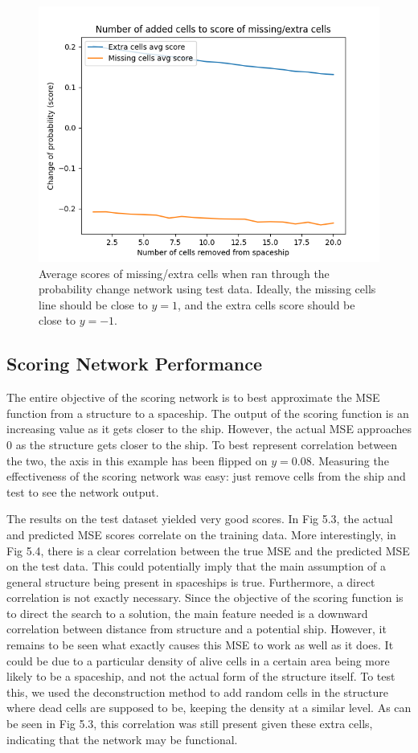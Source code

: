 \documentclass{l4proj}
\begin{document}
\begin{figure}[h!]
\centering
\includegraphics[width=0.7\linewidth]{dissertation/images/graphs/cells_added_n_cells_extra_missing_probability_score_analysis_untrained.png}
\caption{Average scores of missing/extra cells when ran through the probability change network using test data. Ideally, the missing cells line should be close to $y=1$, and the extra cells score should be close to $y=-1$.}
\label{fig:subim1}
\end{figure}


\subsection{Scoring Network Performance}

The entire objective of the scoring network is to best approximate the MSE function from a structure to a spaceship. The output of the scoring function is an increasing value as it gets closer to the ship. However, the actual MSE approaches 0 as the structure gets closer to the ship. To best represent correlation between the two, the axis in this example has been flipped on $y = 0.08$. Measuring the effectiveness of the scoring network was easy: just remove cells from the ship and test to see the network output.

 The results on the test dataset yielded very good scores. In Fig 5.3, the actual and predicted MSE scores correlate on the training data. More interestingly, in Fig 5.4, there is a clear correlation between the true MSE and the predicted MSE on the test data. This could potentially imply that the main assumption of  a general structure being present in spaceships is true. Furthermore, a direct correlation is not exactly necessary. Since the objective of the scoring function is to direct the search to a solution, the main feature needed is a downward correlation between distance from structure and a potential ship. However, it remains to be seen what exactly causes this MSE to work as well as it does. It could be due to a particular density of alive cells in a certain area being more likely to be a spaceship, and not the actual form of the structure itself. To test this, we used the deconstruction method to add random cells in the structure where dead cells are supposed to be, keeping the density at a similar level. As can be seen in Fig 5.3, this correlation was still present given these extra cells, indicating that the network may be functional.
\end{document}
